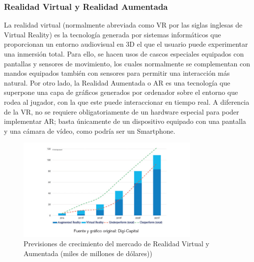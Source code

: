 \subsubsection{Realidad Virtual y Realidad Aumentada}
La realidad virtual (normalmente abreviada como VR por las siglas inglesas de Virtual Reality) es la tecnología generada por sistemas informáticos que proporcionan un entorno audiovisual en 3D el que el usuario puede experimentar una inmersión total. Para ello, se hacen usos de cascos especiales equipados con pantallas y sensores de movimiento, los cuales normalmente se complementan con mandos equipados también con sensores para permitir una interacción más natural.
Por otro lado, la Realidad Aumentada o AR es una tecnología que superpone una capa de gráficos generados por ordenador sobre el entorno que rodea al jugador, con la que este puede interaccionar en tiempo real. A diferencia de la VR, no se requiere obligatoriamente de un hardware especial para poder implementar AR; basta únicamente de un dispositivo equipado con una pantalla y una cámara de vídeo, como podría ser un Smartphone.

\begin{figure}[h]
    \centering
    \includegraphics[width=0.8\textwidth]{images/estadodelarte/mercado/crecimiento-vr}
    \caption{Previsiones de crecimiento del mercado de Realidad Virtual y Aumentada
(miles de millones de dólares))}
\end{figure}


